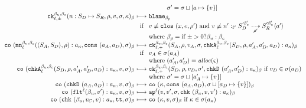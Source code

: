 \documentclass[preprint,onecolumn,9pt]{sigplanconf} %
\begin{document}
\begin{figure*}
\begin{gather*}
\begin{array}{@{}r@{\ }c@{\ }l@{}}
      &&\phantom{\text{where }} \msto' = \ext{\msto}{\maddr}{\setof{\mval}}
      \\
      \ck{\mmlab_u}{\mmlab_c}{\mlab}{\mvariance}{\sarr{\mname}{\mscon_D}{\mscon_R}, \menv, \mval, \msto, \mkont}{\mmlab} &\machstep&
      \sblame{\mmlab_p} \\
      &\text{ if }& \mval \nequiv \clos{\mvar, \mexp, \menv'}
       \text{ and }  \mval \nequiv \blclos{\mname'}{\mmlab_u'}{\mmlab_c'}{\mlab'}{\mscon_D'}{\mscon_R'}{\menv'}{\maddr'} \\
      &&\text{where } \mmlab_p = \varianceite{\mvariance}{\mmlab_u}{\mmlab_c}
      \\
      \co{\spush{\kmon{\mmlab_u}{\mmlab_c}{\mlab}{\sconsc{\mscon_A}{\mscon_D}, \menv}}{\mkaddr},
          \vcons{\maddr_A}{\maddr_D},
          \msto}{\mmlab} &\machstep&
      \ck{\mmlab_u}{\mmlab_c}{\mlab}{+}{\mscon_A, \menv, \mval_A, \msto,
        \spush{\kchkA[^{\mmlab_u, \mmlab_c}_\mlab]{\mscon_D, \menv, \maddr'_A, \maddr'_D, \maddr_D}}{\mkaddr}}{\mmlab} \\
      &\text{ if }& \mval_A \in \msto(\maddr_A) \\
      &&\text{where } (\maddr'_A, \maddr'_D) = \alloc(\mstate)
      \\
      \co{\spush{\kchkA[^{\mmlab_u, \mmlab_c}_\mlab]{\mscon_D, \menv, \maddr'_A, \maddr'_D, \maddr_D}}{\mkaddr},
          \mval, \msto}{\mmlab} &\machstep&
      \ck{\mmlab_u}{\mmlab_c}{\mlab}{+}{\mscon_D, \menv, \mval_D, \msto',
                                \spush{\kchkD{\maddr'_A, \maddr'_D}}{\mkaddr}}{\mmlab}
      \text{ if } \mval_D \in \msto(\maddr_D) \\
      &&\text{where } \msto' = \ext{\msto}{\maddr'_A}{\setof{\mval}}
      \\
      \co{\spush{\kchkD{\maddr_A, \maddr_D}}{\mkaddr}, \mval, \msto}{\mmlab} &\machstep&
      \co{\mkont, \vcons{\maddr_A}{\maddr_D}, \ext{\msto}{\maddr_D}{\setof{\mval}}}{\mmlab}
      \\
      \co{\spush{\kflat[^\mlab]{\mmlab_u, \mval'}}{\mkaddr}, \mval, \msto}{\mmlab} &\machstep&
      \ap[^\mlab]{\mval, \mval', \msto, \spush{\kcheck{\mmlab_u, \mval, \mval'}}{\mkaddr}}{\mmlab}
      \\
      \co{\spush{\kcheck{\mmlab_u, \mval_C, \mval}}{\mkaddr}, \strue, \msto}{\mmlab} &\machstep&
      \co{\mkont, \mval, \msto}{\mmlab} \text{ if } \mkont \in \msto(\mkaddr)

\end{array}
\end{gather*}
\end{figure*}
\end{document}

